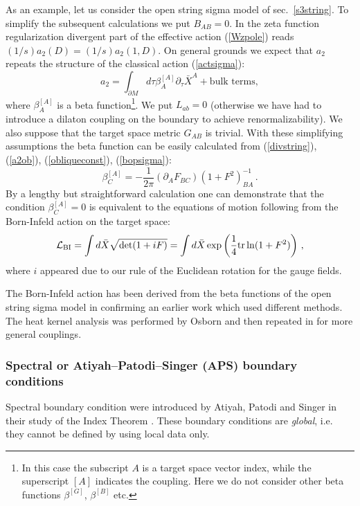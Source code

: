 As an example, let us consider the open string sigma model of sec.\
\ref{s3string}. To simplify the subsequent calculations we put $B_{AB}=0$.
In the zeta function regularization divergent part of the effective
action (\ref{Wzpole}) reads $(1/s)a_2(D)=(1/s)a_2(1,D)$. On general grounds
we expect that $a_2$ repeats the structure of the classical action
(\ref{actsigma}):
\begin{equation}
a_2=\int_{\partial M}d\tau  \beta_A^{[A]} \partial_\tau \bar X^A +
\mbox{bulk terms},\label{divstring} 
\end{equation}
where $\beta_A^{[A]}$ is a beta 
function\footnote{In this case the subscript $A$
is a target space vector index, while the superscript $[A]$ indicates the
coupling. Here we do not consider other beta functions $\beta^{[G]}$,
$\beta^{[B]}$ etc.}. We put $L_{ab}=0$ (otherwise we have had to introduce
a dilaton coupling on the boundary to achieve renormalizability).
We also suppose that the target space metric $G_{AB}$ is trivial.
With these simplifying assumptions the beta function can be easily
calculated from (\ref{divstring}), (\ref{a2ob}), (\ref{obliqueconst}),
(\ref{bopsigma}):
\begin{equation}
\beta^{[A]}_C=-\frac 1{2\pi} (\partial_A F_{BC})
(1+F^2)^{-1}_{BA} \,.\label{betaAC}
\end{equation}
By a lengthy but straightforward calculation one can demonstrate
that the condition $\beta^{[A]}_C=0$ is equivalent to the
equations of motion following from the Born-Infeld action on the
target space:
\begin{equation}
\mathcal{L}_{\rm BI}=\int d\bar X \sqrt{\det (1+iF)}=
\int d\bar X \exp \left( \frac 14 {\rm tr} \ln
(1+F^2) \right)\,,\label{BIaction}
\end{equation}
where $i$ appeared due to our rule of the Euclidean rotation
for the gauge fields. 

The Born-Infeld action has been derived from the beta functions
of the open string sigma model in \cite{Abouelsaood:1987gd,Callan:1987bc}
confirming an earlier work \cite{Fradkin:1985qd} which used different 
methods. The heat kernel analysis was performed by Osborn 
\cite{Osborn:1991gm} and then repeated in \cite{Kummer:2000ae}
for more general couplings. 
\subsubsection{Spectral or Atiyah--Patodi--Singer (APS) boundary conditions}
\label{s5spec}
Spectral boundary condition were introduced by Atiyah, Patodi and
Singer in their study of the Index Theorem 
\cite{Atiyah:1975jf,Atiyah:1976jg,Atiyah:1980jh}. These boundary conditions
are {\it global}, i.e. they cannot be defined by using
local data only.

